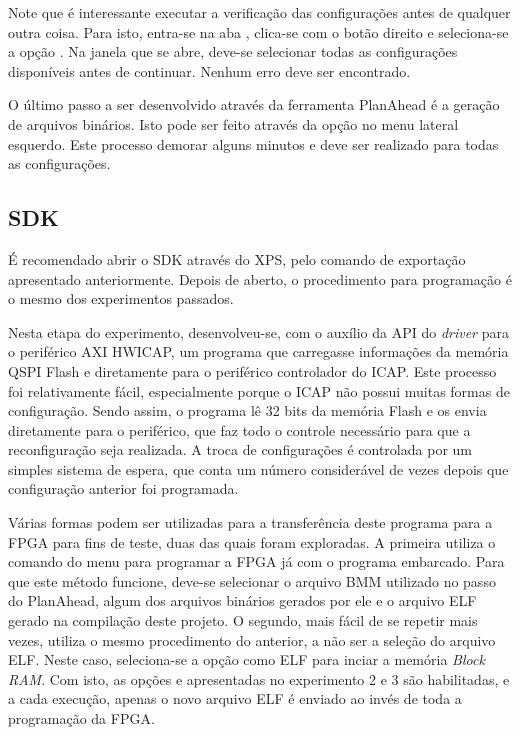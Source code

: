 \documentclass[11pt,a4paper,oneside]{book}
\begin{document}
Note que é interessante executar a verificação das configurações antes de qualquer outra coisa.
Para isto, entra-se na aba , clica-se com o botão direito e seleciona-se a opção .
Na janela que se abre, deve-se selecionar todas as configurações disponíveis antes de continuar.
Nenhum erro deve ser encontrado.

O último passo a ser desenvolvido através da ferramenta PlanAhead é a geração de arquivos binários.
Isto pode ser feito através da opção  no menu lateral esquerdo.
Este processo demorar alguns minutos e deve ser realizado para todas as configurações.

\subsection{SDK}
É recomendado abrir o SDK através do XPS, pelo comando de exportação apresentado anteriormente.
Depois de aberto, o procedimento para programação é o mesmo dos experimentos passados.

Nesta etapa do experimento, desenvolveu-se, com o auxílio da API do \textit{driver} para o periférico AXI HWICAP, um programa que carregasse informações da memória QSPI Flash e diretamente para o periférico controlador do ICAP.
Este processo foi relativamente fácil, especialmente porque o ICAP não possui muitas formas de configuração.
Sendo assim, o programa lê 32 bits da memória Flash e os envia diretamente para o periférico, que faz todo o controle necessário para que a reconfiguração seja realizada.
A troca de configurações é controlada por um simples sistema de espera, que conta um número considerável de vezes depois que configuração anterior foi programada.

Várias formas podem ser utilizadas para a transferência deste programa para a FPGA para fins de teste, duas das quais foram exploradas.
A primeira utiliza o comando  do menu  para programar a FPGA já com o programa embarcado.
Para que este método funcione, deve-se selecionar o arquivo BMM utilizado no passo do PlanAhead, algum dos arquivos binários gerados por ele e o arquivo ELF gerado na compilação deste projeto.
O segundo, mais fácil de se repetir mais vezes, utiliza o mesmo procedimento do anterior, a não ser a seleção do arquivo ELF.
Neste caso, seleciona-se a opção  como ELF para inciar a memória \textit{Block RAM}.
Com isto, as opções  e  apresentadas no experimento 2 e 3 são habilitadas, e a cada execução, apenas o novo arquivo ELF é enviado ao invés de toda a programação da FPGA.
\end{document}
